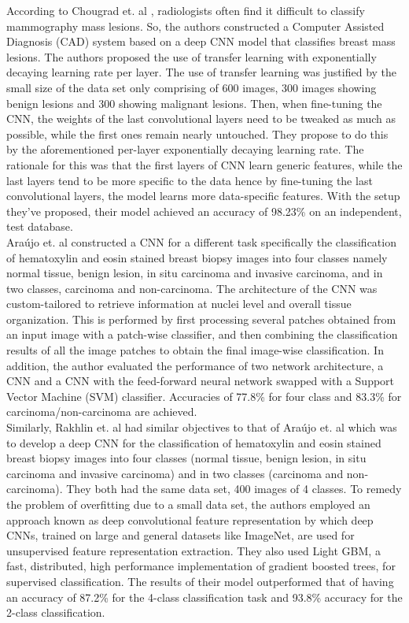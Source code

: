 	According to Chougrad et. al \cite{chougrad}, radiologists often find it difficult to classify mammography mass lesions. So, the authors constructed a Computer Assisted Diagnosis (CAD) system based on a deep CNN model that classifies breast mass lesions. The authors proposed the use of transfer learning with exponentially decaying learning rate per layer. The use of transfer learning was justified by the small size of the data set only comprising of 600 images, 300 images showing benign lesions and 300 showing malignant lesions. Then, when fine-tuning the CNN, the weights of the last convolutional layers need to be tweaked as much as possible, while the first ones remain nearly untouched. They propose to do this by the aforementioned per-layer exponentially decaying learning rate. The rationale for this was that the first layers of CNN learn generic features, while the last layers tend to be more specific to the data hence by fine-tuning the last convolutional layers, the model learns more data-specific features. With the setup they've proposed, their model achieved an accuracy of 98.23\% on an independent, test database. \\

	Araújo et. al \cite{araujo} constructed a CNN for a different task specifically the classification of hematoxylin and eosin stained breast biopsy images into four classes namely normal tissue, benign lesion, in situ carcinoma and invasive carcinoma, and in two classes, carcinoma and non-carcinoma. The architecture of the CNN was custom-tailored to retrieve information at nuclei level and overall tissue organization. This is performed by first processing several patches obtained from an input image with a patch-wise classifier, and then combining the classification results of all the image patches to obtain the final image-wise classification. In addition, the author evaluated the performance of two network architecture, a CNN and a CNN with the feed-forward neural network swapped with a Support Vector Machine (SVM) classifier. Accuracies of 77.8\% for four class and 83.3\% for carcinoma/non-carcinoma are achieved. \\

	Similarly, Rakhlin et. al \cite{rakhlin} had similar objectives to that of Araújo et. al which was to develop a deep CNN for the classification of hematoxylin and eosin stained breast biopsy images into four classes (normal tissue, benign lesion, in situ carcinoma and invasive carcinoma) and in two classes (carcinoma and non-carcinoma). They both had the same data set, 400 images of 4 classes. To remedy the problem of overfitting due to a small data set, the authors employed an approach known as deep convolutional feature representation by which deep CNNs, trained on large and general datasets like ImageNet, are used for unsupervised feature representation extraction. They also used Light GBM, a fast, distributed, high performance implementation of gradient boosted trees, for supervised classification. The results of their model outperformed that of \cite{araujo} having an accuracy of 87.2\% for the 4-class classification task and 93.8\% accuracy for the 2-class classification. \\

